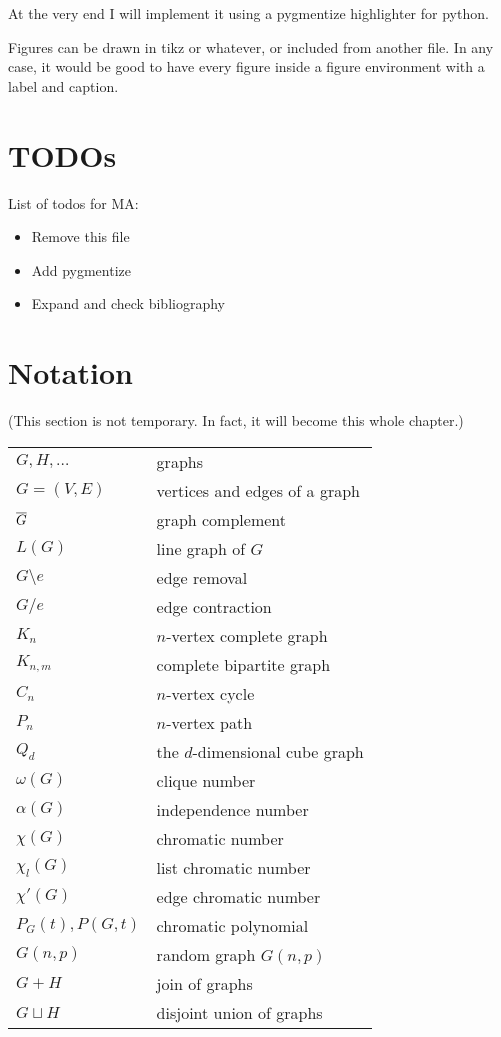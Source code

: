 At the very end I will implement it using a pygmentize highlighter for python.

Figures can be drawn in tikz or whatever, or included from another file. In any case, it would be good to have every figure inside a figure environment with a label and caption.

\section{TODOs}
List of todos for MA:
\begin{itemize}
\item Remove this file
\item Add pygmentize
\item Expand and check bibliography
\end{itemize}


\section{Notation}
(This section is not temporary. In fact, it will become this whole chapter.)

\begin{center}
\begin{tabular}{ll}
$G, H, \ldots$          	&  graphs \\
$G=(V,E)$					&  vertices and edges of a graph \\
$\overline{G}$					&  graph complement \\
$L(G)$						&  line graph of $G$ \\
$G\setminus e$				&  edge removal \\
$G/e$						&  edge contraction \\
$K_n$						&  $n$-vertex complete graph \\
$K_{n,m}$					&  complete bipartite graph \\
$C_n$						&  $n$-vertex cycle \\
$P_n$						&  $n$-vertex path \\
$Q_d$						&  the $d$-dimensional cube graph \\
$\omega(G)$					&  clique number \\
$\alpha(G)$					&  independence number \\
$\chi(G)$					&  chromatic number \\
$\chi_l(G)$					&  list chromatic number \\
$\chi'(G)$					&  edge chromatic number \\
$P_G(t), P(G,t)$			&  chromatic polynomial \\
$G(n,p)$					&  random graph $G(n,p)$ \\
$G+H$						&  join of graphs \\
$G\sqcup H$					&  disjoint union of graphs
\end{tabular}
\end{center}